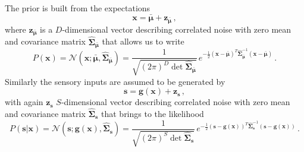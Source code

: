 \documentclass[a4paper, 10pt]{article}
\begin{document}
The prior is built from the expectations 
\begin{equation}
\mathbf x = \bm \bar{\bm \mu} + \mathbf z_{\bar{\bm \mu}} \, ,
\end{equation}
where $\mathbf z_{\bar{\bm \mu}}$ is a $D$-dimensional vector describing correlated noise with zero mean and covariance matrix $\bm{\hat{\Sigma}}_{\bar{\bm \mu}}$ that allows us to write
\begin{equation}
P(\mathbf x) = \mathcal{N}(\mathbf x; \bar{\bm \mu}, \bm{\hat{\Sigma}}_{\bar{\bm \mu}}) = \frac{1}{\sqrt{( 2 \pi)^{D} \det \boldsymbol{\hat{\Sigma}}_{\bar{\bm \mu}}}} \, e^{ - \frac{1}{2} (\mathbf x - \bm \bar{\bm \mu})^T \bm{\hat{\Sigma}}_{\bar{\bm \mu}}^{-1} (\mathbf x - \bm \bar{\bm \mu})} \, .
\end{equation}
Similarly the sensory inputs are assumed to be generated by
\begin{equation}
\mathbf s = \bm g(\mathbf x) + \mathbf z_{\mathbf s} \, ,
\end{equation}
with again $\mathbf z_{\mathbf s}$ $S$-dimensional vector describing correlated noise with zero mean and covariance matrix $\bm{\hat{\Sigma}}_{\mathbf s}$ that brings to the likelihood
\begin{equation}
P(\mathbf s | \mathbf x) = \mathcal{N}(\mathbf s; \bm g(\mathbf x), \bm{\hat{\Sigma}}_{\mathbf s}) = \frac{1}{\sqrt{( 2 \pi)^{S} \det \boldsymbol{\hat{\Sigma}}_{\mathbf s}}} \, e^{ - \frac{1}{2} \left(\mathbf s - \bm g(\mathbf x) \right)^T \bm{\hat{\Sigma}}_{\mathbf s}^{-1} \left(\mathbf s - \bm g(\mathbf x) \right)} \, .
\end{equation}
\end{document}
